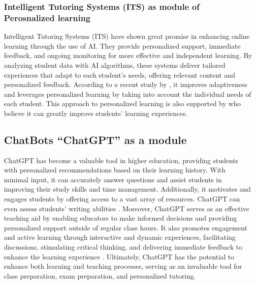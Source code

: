 \subsubsection{Intelligent Tutoring Systems (ITS) as module of Perosnalized learning}

Intelligent Tutoring Systems (ITS) have shown great promise in enhancing online learning
through the use of AI. They provide personalized support, immediate feedback, and ongoing
monitoring for more effective and independent learning. By analyzing student data with
AI algorithms, these systems deliver tailored experiences that adapt to each student's needs,
offering relevant content and personalized feedback.
According to a recent study by \citep{l_d_of_cs_akshara_first_grade_college_2023}, it  improves
adaptiveness and leverages personalized learning by taking into account the individual needs of each student.
This approach to personalized learning is also supported by \citep{bradac_design_2022} who believe it can greatly
improve students' learning experiences.

\subsection{ChatBots ``ChatGPT'' as a module}

ChatGPT has become a valuable tool in higher education, providing students with personalized
recommendations based on their learning history. With minimal input, it can accurately answer
questions and assist students in improving their study skills and time management. Additionally,
it motivates and engages students by offering access to a vast array of resources. ChatGPT can even
assess students' writing abilities \citep{mohammed_exploring_2023}.
Moreover, ChatGPT serves as an effective teaching aid by enabling educators to make informed decisions
and providing personalized support outside of regular class hours. It also promotes engagement and active
learning through interactive and dynamic experiences, facilitating discussions, stimulating critical thinking,
and delivering immediate feedback to enhance the learning experience \citep{schonberger_chatgpt_2023}.
Ultimately, ChatGPT has the potential to enhance both learning and teaching processes, serving as an invaluable
tool for class preparation, exam preparation, and personalized tutoring\citep{domenech_chatgpt_2023}.

